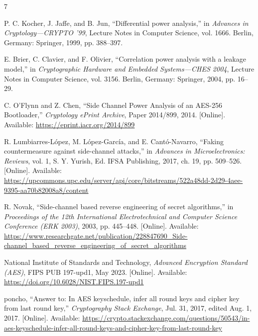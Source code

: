 \documentclass[conference,10pt,letterpaper]{IEEEtran}
\begin{document}
\clearpage
\onecolumn
\appendices

\clearpage
\twocolumn
\begin{thebibliography}{7}
\raggedright
\def\UrlBreaks{\do\/\do\.\do\-}
P. C. Kocher, J. Jaffe, and B. Jun, ``Differential power analysis,'' in \emph{Advances in Cryptology---CRYPTO '99}, Lecture Notes in Computer Science, vol. 1666. Berlin, Germany: Springer, 1999, pp. 388--397.

E. Brier, C. Clavier, and F. Olivier, ``Correlation power analysis with a leakage model,'' in \emph{Cryptographic Hardware and Embedded Systems---CHES 2004}, Lecture Notes in Computer Science, vol. 3156. Berlin, Germany: Springer, 2004, pp. 16--29.

C. O'Flynn and Z. Chen, ``Side Channel Power Analysis of an AES-256 Bootloader,'' \emph{Cryptology ePrint Archive}, Paper 2014/899, 2014. [Online]. Available: \url{https://eprint.iacr.org/2014/899}

R. Lumbiarres-L\'opez, M. L\'opez-Garc\'ia, and E. Cant\'o-Navarro, ``Faking countermeasure against side-channel attacks,'' in \emph{Advances in Microelectronics: Reviews}, vol. 1, S. Y. Yurish, Ed. IFSA Publishing, 2017, ch. 19, pp. 509--526. [Online]. Available: \url{https://upcommons.upc.edu/server/api/core/bitstreams/522a48dd-2d29-4aee-9395-aa70b82008a8/content}

R. Novak, ``Side-channel based reverse engineering of secret algorithms,'' in \emph{Proceedings of the 12th International Electrotechnical and Computer Science Conference (ERK 2003)}, 2003, pp. 445--448. [Online]. Available: \url{https://www.researchgate.net/publication/228847690_Side-channel_based_reverse_engineering_of_secret_algorithms}

National Institute of Standards and Technology, \emph{Advanced Encryption Standard (AES)}, FIPS PUB 197-upd1, May 2023. [Online]. Available: \url{https://doi.org/10.6028/NIST.FIPS.197-upd1}

poncho, ``Answer to: In AES keyschedule, infer all round keys and cipher key from last round key,'' \emph{Cryptography Stack Exchange}, Jul. 31, 2017, edited Aug. 1, 2017. [Online]. Available: \url{https://crypto.stackexchange.com/questions/50543/in-aes-keyschedule-infer-all-round-keys-and-cipher-key-from-last-round-key}

\end{thebibliography}
\end{document}
